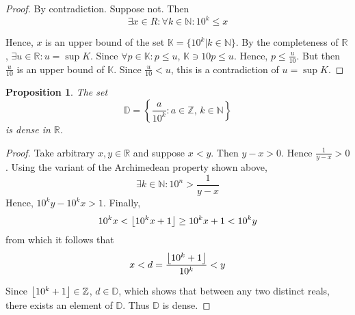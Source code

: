 \documentclass[letterpaper,11pt]{article}
\DeclarePairedDelimiter\floor{\lfloor}{\rfloor}
\newtheorem{prop}{Proposition}
\newcommand{\D}{\mathbb{D}}
\newcommand{\K}{\mathbb{K}}
\newcommand{\N}{\mathbb{N}}
\newcommand{\R}{\mathbb{R}}
\newcommand{\Z}{\mathbb{Z}}
\begin{document}
\begin{proof}
    By contradiction. Suppose not. Then
    \begin{equation*}
        \exists x \in R: \forall k \in \N: 10^k \leq x
    \end{equation*}

    Hence, $x$ is an upper bound of the set $\K = \{ 10^k | k \in \N \}$.
    By the completeness of $\R$, $\exists u \in \R : u = \sup{K}$.
    Since $\forall p \in \K: p \leq u$, $\K \ni 10p \leq u$.
    Hence, $p \leq \frac{u}{10}$. But then $\frac{u}{10}$ is an upper bound of
    $\K$. Since $\frac{u}{10} < u$, this is a contradiction of $u = \sup{K}$.
\end{proof}

\begin{prop}
    The set
    \begin{equation*}
        \D = \left\{ \frac{a}{10^k} : a \in \Z,\, k \in \N \right\}
    \end{equation*}
    is dense in $\R$.
\end{prop}

\begin{proof}
    Take arbitrary $x, y \in \R$ and suppose $x < y$.
    Then $y - x > 0$.
    Hence $\frac{1}{y - x} > 0$.
    Using the variant of the Archimedean property shown above,
    \begin{equation*}
        \exists k \in \N: 10^n > \frac{1}{y - x}
    \end{equation*}
    Hence, $10^k y - 10^k x > 1$.
    Finally,
    \begin{equation*}
        10^k x < \floor*{10^k x + 1} \geq 10^k x + 1 < 10^k y
    \end{equation*}
    from which it follows that
    \begin{equation*}
        x < d = \frac{\floor*{10^k + 1}}{10^k} < y
    \end{equation*}

    Since $\floor*{10^k + 1} \in \Z$, $d \in \D$, which shows that between any
    two distinct reals, there exists an element of $\D$. Thus $\D$ is dense.
\end{proof}
\end{document}
